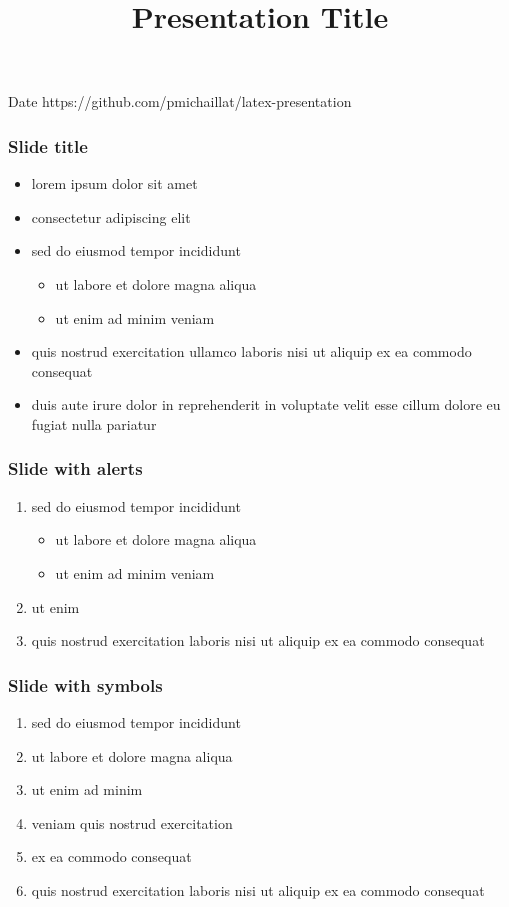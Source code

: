 \documentclass[12pt,xcolor={dvipsnames},hyperref={pdftex,pdfpagemode=UseNone,hidelinks,pdfdisplaydoctitle=true},usepdftitle=false]{beamer}
\begin{document}
\title{Presentation Title}
%
{Date}%
{https://github.com/pmichaillat/latex-presentation}
\frame[plain]{\titlepage}

\begin{frame}
\frametitle{Slide title}
\begin{itemize}
\item lorem ipsum dolor sit amet
\item consectetur adipiscing elit
\item sed do eiusmod tempor incididunt
\begin{itemize}
\item ut labore et dolore magna aliqua
\item ut enim ad minim veniam
\end{itemize}
\item quis nostrud exercitation ullamco laboris nisi ut aliquip ex ea commodo consequat
\item duis aute irure dolor in reprehenderit in voluptate velit esse cillum dolore eu fugiat nulla pariatur
\end{itemize}
\end{frame}

\begin{frame}
\frametitle{Slide with alerts}
\begin{enumerate}
\item sed do eiusmod tempor incididunt
\begin{itemize}
\item ut labore et dolore magna aliqua
\item ut enim ad minim veniam
\end{itemize}
\item ut enim 
\item quis nostrud exercitation  laboris nisi ut aliquip ex ea commodo consequat
\end{enumerate}
\end{frame}

\begin{frame}
\frametitle{Slide with symbols}
\begin{enumerate}
\item sed do eiusmod tempor \so incididunt
\item ut labore et dolore \then magna aliqua
\item ut enim ad minim \up
\item veniam quis nostrud exercitation \down
\item ex ea commodo consequat \flat 
\item quis nostrud exercitation \tb laboris nisi ut aliquip \tb ex ea commodo consequat
\end{enumerate}
\end{frame}
\end{document}
